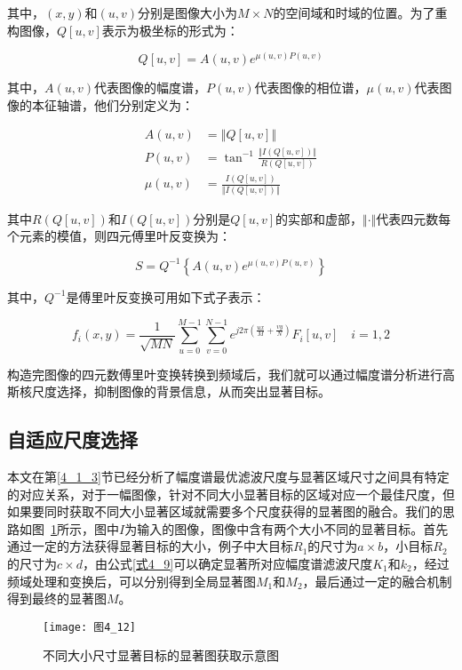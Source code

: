 其中，$(x,y)$和$(u,v)$分别是图像大小为$M×N$的空间域和时域的位置。为了重构图像，$Q[u,v]$表示为极坐标的形式为：
\begin{linenomath}
\begin{equation}
  \label{式4_19}
  Q[u,v]=A(u,v)e^{\mu(u,v) P(u,v)}
\end{equation}
\end{linenomath}
其中，$A(u,v)$代表图像的幅度谱，$P(u,v)$代表图像的相位谱，$\mu(u,v)$代表图像的本征轴谱，他们分别定义为：
\begin{linenomath}
\begin{align}
A(u,v) &= \left\Vert Q[u,v] \right\Vert \label{式4_20}\\
P(u,v) &= \tan^{-1}\frac{\left\Vert I\left(Q[u,v]\right)\right\Vert}{R\left(Q[u,v]\right)} \label{式4_21}\\
\mu(u,v) &= \frac{I\left(Q[u,v]\right)}{\left\Vert I\left(Q[u,v]\right)\right\Vert} \label{式4_22}
\end{align}
\end{linenomath}
其中$R\left(Q[u,v]\right)$和$I\left(Q[u,v]\right)$分别是$Q[u,v]$的实部和虚部，$\Vert\cdot\Vert$代表四元数每个元素的模值，则四元傅里叶反变换为：
\begin{linenomath}
\begin{equation}
  \label{式4_23}
  S=Q^{-1}\left\{A(u,v)e^{\mu(u,v)P(u,v)}\right\}
\end{equation}
\end{linenomath}
其中，$Q^{-1}$是傅里叶反变换可用如下式子表示：
\begin{linenomath}
\begin{equation}
f_i(x,y) = \frac{1}{\sqrt{MN}}\sum_{u=0}^{M-1}\sum_{v=0}^{N-1}e^{j 2\pi\left(\frac{ux}{M}+\frac{vy}{N}\right)}F_{i}[u,v]\quad i=1,2  
\label{式4_24}
\end{equation}
\end{linenomath}
构造完图像的四元数傅里叶变换转换到频域后，我们就可以通过幅度谱分析进行高斯核尺度选择，抑制图像的背景信息，从而突出显著目标。

\subsection{自适应尺度选择}
\label{4_2_2}

本文在第\ref{4_1_3}节已经分析了幅度谱最优滤波尺度与显著区域尺寸之间具有特定的对应关系，对于一幅图像，针对不同大小显著目标的区域对应一个最佳尺度，但如果要同时获取不同大小显著区域就需要多个尺度获得的显著图的融合。我们的思路如图~\ref{图4_12}所示，图中$I$为输入的图像，图像中含有两个大小不同的显著目标。首先通过一定的方法获得显著目标的大小，例子中大目标$R_{1}$的尺寸为$a×b$，小目标$R_{2}$的尺寸为$c×d$，由公式\ref{式4_9}可以确定显著所对应幅度谱滤波尺度$K_{1}$和$k_{2}$，经过频域处理和变换后，可以分别得到全局显著图$M_{1}$和$M_{2}$，最后通过一定的融合机制得到最终的显著图$M$。
\begin{figure}[h]
  \centering
  \texttt{[image: 图4\_12]}
  \caption{不同大小尺寸显著目标的显著图获取示意图}   
  \label{图4_12} 
\end{figure}

